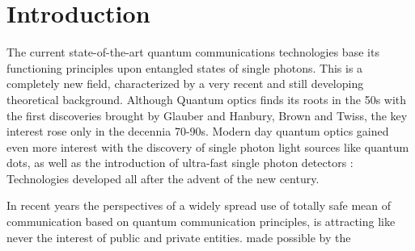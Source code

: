 \chapter{Introduction}

\begin{comment}
    Motivations and guide to the general structure of the thesis among the different chapters !
\end{comment}

The current state-of-the-art quantum communications technologies base its functioning principles upon entangled states of single photons.
This is a completely new field, characterized by a very recent and still developing theoretical background. 
Although Quantum optics finds its roots in the 50s with the first discoveries brought by Glauber and Hanbury, Brown and Twiss, the key interest rose only in the decennia 70-90s.
Modern day quantum optics gained even more interest with the discovery of single photon light sources like quantum dots, as well as the introduction of ultra-fast single photon detectors : Technologies developed all after the advent of the new century. %

In recent years the perspectives of a widely spread use of totally safe mean of communication based on quantum communication principles, is attracting like never the interest of public and private entities.
made possible by the
